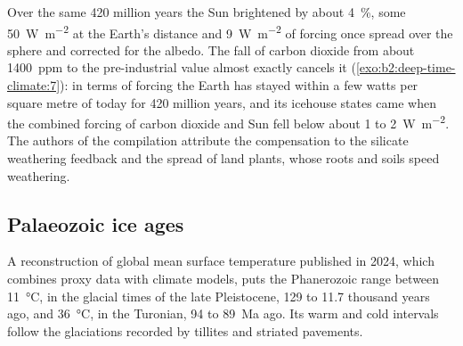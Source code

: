\begin{omfigure}
\par{}
\end{omfigure}

Over the same 420 million years the Sun brightened by about \qty{4}{\percent}, some
\qty{50}{W.m^{-2}} at the Earth's distance and \qty{9}{W.m^{-2}} of forcing once spread over the
sphere and corrected for the albedo. The fall of carbon dioxide from about \qty{1400}{ppm} to the
pre-industrial value almost exactly cancels it (\cref{exo:b2:deep-time-climate:7}): in terms of
forcing the Earth has stayed within a few watts per square metre of today for 420 million years,
and its icehouse states came when the combined forcing of carbon dioxide and Sun fell below about 1
to \qty{2}{W.m^{-2}}. The authors of the compilation attribute the compensation to the silicate
weathering feedback and the spread of land plants, whose roots and soils speed weathering.

\subsection*{Palaeozoic ice ages}

A reconstruction of global mean surface temperature published in 2024, which combines proxy data
with climate models, puts the Phanerozoic range between \qty{11}{\celsius}, in the glacial times of
the late Pleistocene, 129 to 11.7 thousand years ago, and \qty{36}{\celsius}, in the Turonian, 94 to \qty{89}{Ma} ago.
Its warm and cold intervals follow the glaciations recorded by tillites and striated pavements.

